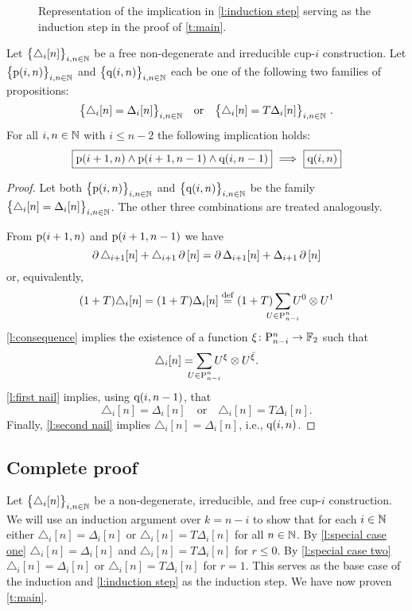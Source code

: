 \begin{figure}
	\centering
	
	\caption{Representation of the implication in \cref{l:induction step} serving as the induction step in the proof of \cref{t:main}.}
	\label{f:induction step}
\end{figure}

\begin{lemma} \label{l:induction step}
	Let $\big\{ \triangle_i [n] \big\}_{i,n\in\mathbb{N}}$ be a free non-degenerate and irreducible \mbox{cup-$i$} construction.
	Let $\big\{ \mathrm{p}(i,n) \big\}_{i,n \in \mathbb{N}}$ and $\big\{ \mathrm{q}(i,n) \big\}_{i,n \in \mathbb{N}}$ each be one of the following two families of propositions:
	\[
	\big\{ \triangle_i [n] = \Delta_ i [n] \big\}_{i,n \in \N}
	\quad \text{or} \quad
	\big\{ \triangle_i [n] = T \Delta_ i [n] \big\}_{i,n \in \N} \ .
	\]
	For all $i,n \in \mathbb{N}$ with $i \leq n-2$ the following implication holds:
	\[
	\boxed{\mathrm{p}(i+1,n) \wedge \mathrm{p}(i+1,n-1) \wedge \mathrm{q}(i,n-1)}\ \Longrightarrow\ \boxed{\mathrm{q}(i,n)}
	\]
\end{lemma}

\begin{proof}
	Let both $\big\{ \mathrm{p}(i,n) \big\}_{i,n\in\mathbb{N}}$ and $\big\{ \mathrm{q}(i,n) \big\}_{i,n\in\mathbb{N}}$ be the family $\big\{ \triangle_i [n] = \Delta_i [n] \big\}_{i,n \in \mathbb{N}}$.
	The other three combinations are treated analogously.

	From $\mathrm{p}(i+1,n)$ and $\mathrm{p}(i+1,n-1)$ we have
	\[
	\operatorname{\partial} \triangle_{i+1} [n] + \triangle_{i+1} \operatorname{\partial} \, [n] =
	\operatorname{\partial} \Delta_{i+1} [n] + \Delta_{i+1} \operatorname{\partial} \, [n]
	\]
	or, equivalently,
	\begin{align*}
	(1+T) \triangle_i [n] =
	(1+T) \Delta_i [n] \defeq
	(1+T) \sum_{\mathclap{U \in \P_{n-i}^n}} {U^0} \ot {U^1}
	\end{align*}
	\cref{l:consequence} implies the existence of a function $\xi \colon \mathrm{P}_{n-i}^n \to {\mathbb{F}_2}$ such that
	\[
	\triangle_i [n] =
	\sum_{\mathclap{U \in \P_{n-i}^n}} U^\xi \ot U^\barxi.
	\]
	\cref{l:first nail} implies, using $\mathrm{q}(i,n-1)$, that
	\[
	\triangle_i [n] = \Delta_i [n]
	\quad \text{or} \quad
	\triangle_i [n] = T \Delta_i [n].
	\]
	Finally, \cref{l:second nail} implies $\triangle_i [n] = \Delta_i [n]$, i.e., $\mathrm{q}(i,n)$.
\end{proof}

\subsection{Complete proof} \label{ss:proof}

Let $\big\{ \triangle_i [n] \big\}_{i,n\in\mathbb{N}}$ be a non-degenerate, irreducible, and free \mbox{cup-$i$} construction.
We will use an induction argument over $k = n-i$ to show that for each $i \in \mathbb{N}$ either $\triangle_i [n] = \Delta_i [n]$ or
$\triangle_i [n] = T \Delta_i [n]$ for all $n \in \mathbb{N}$.
By \cref{l:special case one} $\triangle_i [n] = \Delta_i [n]$ and $\triangle_i [n] = T \Delta_i [n]$ for $r \leq 0$.
By \cref{l:special case two} $\triangle_i [n] = \Delta_i [n]$ or $\triangle_i [n] = T \Delta_i [n]$ for $r = 1$.
This serves as the base case of the induction and \cref{l:induction step} as the induction step.
We have now proven \cref{t:main}.
